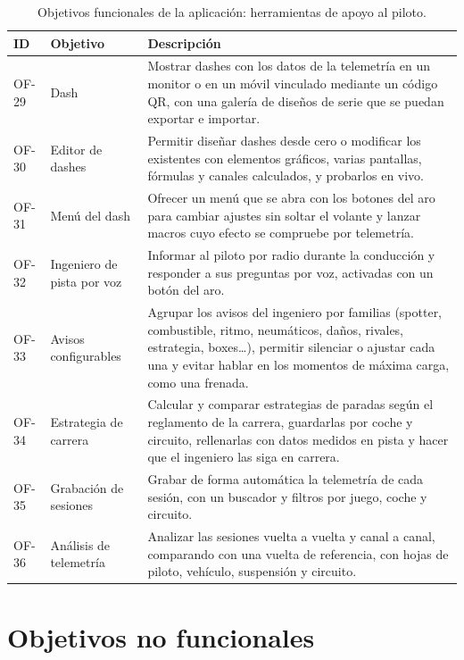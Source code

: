 \begin{table}[H]
	\centering
	\caption{Objetivos funcionales de la aplicación: herramientas de apoyo al piloto.}
	\label{tab:of-app-apoyo}
	\small
	\begin{tabularx}{\textwidth}{@{}l>{\raggedright\arraybackslash}p{3.6cm}X@{}}
		\toprule
		\textbf{ID} & \textbf{Objetivo} & \textbf{Descripción} \\
		\midrule
		OF-29 & Dash &
		Mostrar dashes con los datos de la telemetría en un monitor o en un móvil vinculado mediante un código QR, con una galería de diseños de serie que se puedan exportar e importar. \\
		OF-30 & Editor de dashes &
		Permitir diseñar dashes desde cero o modificar los existentes con elementos gráficos, varias pantallas, fórmulas y canales calculados, y probarlos en vivo. \\
		OF-31 & Menú del dash &
		Ofrecer un menú que se abra con los botones del aro para cambiar ajustes sin soltar el volante y lanzar macros cuyo efecto se compruebe por telemetría. \\
		OF-32 & Ingeniero de pista por voz &
		Informar al piloto por radio durante la conducción y responder a sus preguntas por voz, activadas con un botón del aro. \\
		OF-33 & Avisos configurables &
		Agrupar los avisos del ingeniero por familias (spotter, combustible, ritmo, neumáticos, daños, rivales, estrategia, boxes\ldots), permitir silenciar o ajustar cada una y evitar hablar en los momentos de máxima carga, como una frenada. \\
		OF-34 & Estrategia de carrera &
		Calcular y comparar estrategias de paradas según el reglamento de la carrera, guardarlas por coche y circuito, rellenarlas con datos medidos en pista y hacer que el ingeniero las siga en carrera. \\
		OF-35 & Grabación de sesiones &
		Grabar de forma automática la telemetría de cada sesión, con un buscador y filtros por juego, coche y circuito. \\
		OF-36 & Análisis de telemetría &
		Analizar las sesiones vuelta a vuelta y canal a canal, comparando con una vuelta de referencia, con hojas de piloto, vehículo, suspensión y circuito. \\
		\bottomrule
	\end{tabularx}
\end{table}

\section{Objetivos no funcionales}
\label{sec:objetivos-no-funcionales}

